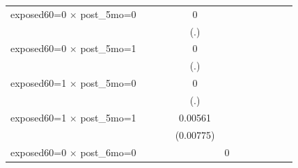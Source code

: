 \begin{table}[htbp]
\begin{tabular}{l*{11}{c}}
\addlinespace
exposed60=0 $\times$ post\_5mo=0&                     &                     &                     &           0         &                     &                     &                     &                     &                     &                     &                     \\
                    &                     &                     &                     &         (.)         &                     &                     &                     &                     &                     &                     &                     \\
\addlinespace
exposed60=0 $\times$ post\_5mo=1&                     &                     &                     &           0         &                     &                     &                     &                     &                     &                     &                     \\
                    &                     &                     &                     &         (.)         &                     &                     &                     &                     &                     &                     &                     \\
\addlinespace
exposed60=1 $\times$ post\_5mo=0&                     &                     &                     &           0         &                     &                     &                     &                     &                     &                     &                     \\
                    &                     &                     &                     &         (.)         &                     &                     &                     &                     &                     &                     &                     \\
\addlinespace
exposed60=1 $\times$ post\_5mo=1&                     &                     &                     &     0.00561         &                     &                     &                     &                     &                     &                     &                     \\
                    &                     &                     &                     &   (0.00775)         &                     &                     &                     &                     &                     &                     &                     \\
\addlinespace
exposed60=0 $\times$ post\_6mo=0&                     &                     &                     &                     &           0         &                     &                     &                     &                     &                     &                     \\

\end{tabular}
\end{table}
